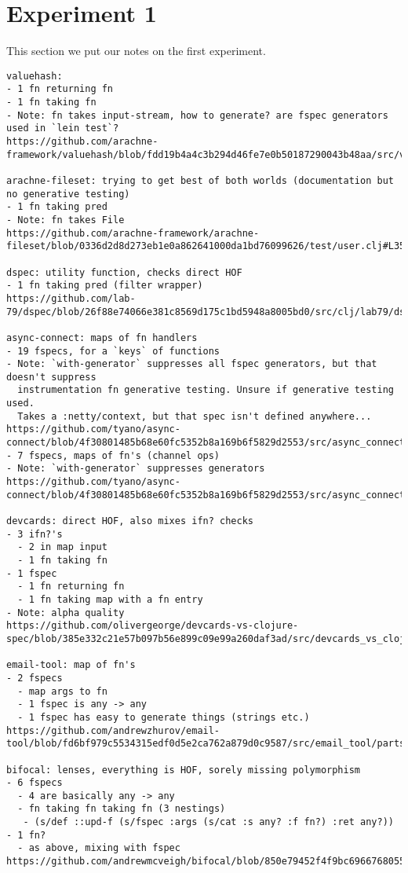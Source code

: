 \section{Experiment 1}
\label{appendix1}

This section we put our notes on the first experiment.

\begingroup
    \fontsize{5pt}{7pt}\selectfont
\begin{verbatim}
valuehash: 
- 1 fn returning fn
- 1 fn taking fn
- Note: fn takes input-stream, how to generate? are fspec generators used in `lein test`?
https://github.com/arachne-framework/valuehash/blob/fdd19b4a4c3b294d46fe7e0b50187290043b48aa/src/valuehash/specs.clj

arachne-fileset: trying to get best of both worlds (documentation but no generative testing)
- 1 fn taking pred
- Note: fn takes File
https://github.com/arachne-framework/arachne-fileset/blob/0336d2d8d273eb1e0a862641000da1bd76099626/test/user.clj#L35

dspec: utility function, checks direct HOF
- 1 fn taking pred (filter wrapper)
https://github.com/lab-79/dspec/blob/26f88e74066e381c8569d175c1bd5948a8005bd0/src/clj/lab79/dspec/util.clj

async-connect: maps of fn handlers
- 19 fspecs, for a `keys` of functions
- Note: `with-generator` suppresses all fspec generators, but that doesn't suppress
  instrumentation fn generative testing. Unsure if generative testing used.
  Takes a :netty/context, but that spec isn't defined anywhere...
https://github.com/tyano/async-connect/blob/4f30801485b68e60fc5352b8a169b6f5829d2553/src/async_connect/netty/handler.clj
- 7 fspecs, maps of fn's (channel ops)
- Note: `with-generator` suppresses generators
https://github.com/tyano/async-connect/blob/4f30801485b68e60fc5352b8a169b6f5829d2553/src/async_connect/server.clj#L46

devcards: direct HOF, also mixes ifn? checks
- 3 ifn?'s
  - 2 in map input
  - 1 fn taking fn
- 1 fspec
  - 1 fn returning fn
  - 1 fn taking map with a fn entry
- Note: alpha quality
https://github.com/olivergeorge/devcards-vs-clojure-spec/blob/385e332c21e57b097b56e899c09e99a260daf3ad/src/devcards_vs_clojure_spec/core_specs.cljc#L7

email-tool: map of fn's
- 2 fspecs
  - map args to fn
  - 1 fspec is any -> any
  - 1 fspec has easy to generate things (strings etc.)
https://github.com/andrewzhurov/email-tool/blob/fd6bf979c5534315edf0d5e2ca762a879d0c9587/src/email_tool/parts.clj#L8

bifocal: lenses, everything is HOF, sorely missing polymorphism
- 6 fspecs
  - 4 are basically any -> any
  - fn taking fn taking fn (3 nestings)
   - (s/def ::upd-f (s/fspec :args (s/cat :s any? :f fn?) :ret any?))
- 1 fn?
  - as above, mixing with fspec
https://github.com/andrewmcveigh/bifocal/blob/850e79452f4f9bc6966768055acfc7aae6671f80/src/bifocal/lens.clj#L36


\end{verbatim}
